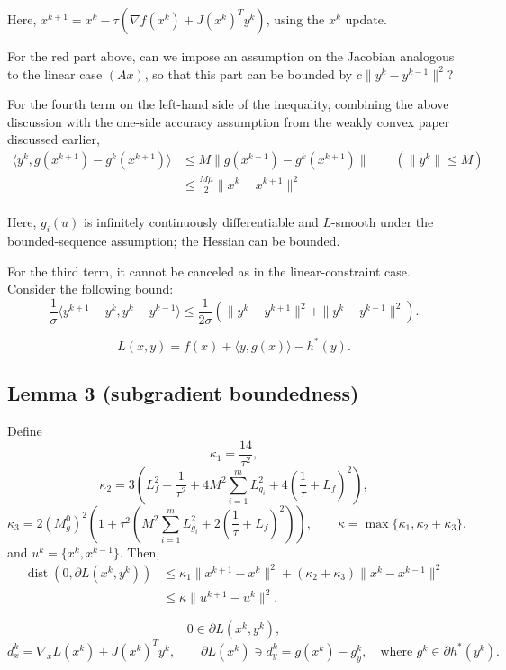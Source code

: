 \documentclass[11pt]{article}
\numberwithin{equation}{section}
\newcommand{\dist}{\operatorname{dist}}
\begin{document}
Here, $x^{k+1}=x^k-\tau(\nabla f(x^k)+J(x^k)^Ty^k)$, using the $x^k$ update.

For the red part above, can we impose an assumption on the Jacobian analogous to the linear case $(Ax)$, so that this part can be bounded by $c\|y^k-y^{k-1}\|^2$?

For the fourth term on the left-hand side of the inequality, combining the above discussion with the one-side accuracy assumption from the weakly convex paper discussed earlier,
\begin{align*}
\langle y^k,g(x^{k+1})-g^k(x^{k+1})\rangle
&\le M\|g(x^{k+1})-g^k(x^{k+1})\|\qquad(\|y^k\|\le M)\\
&\le \frac{M\mu}{2}\|x^k-x^{k+1}\|^2\\
\end{align*}

Here, $g_i(u)$ is infinitely continuously differentiable and $L$-smooth under the bounded-sequence assumption; the Hessian can be bounded.

For the third term, it cannot be canceled as in the linear-constraint case. Consider the following bound:
\[
\frac{1}{\sigma}\langle y^{k+1}-y^k,y^k-y^{k-1}\rangle
\le \frac{1}{2\sigma}\left(\|y^k-y^{k+1}\|^2+\|y^k-y^{k-1}\|^2\right).
\]

\[
L(x,y)=f(x)+\langle y,g(x)\rangle-h^*(y). \tag{2.12}
\]

\subsection*{Lemma 3 (subgradient boundedness)}

Define
\[
\kappa_1=\frac{14}{\tau^2},
\]
\[
\kappa_2=3\left(L_f^2+\frac{1}{\tau^2}+4M^2\sum_{i=1}^mL_{g_i}^2+4\left(\frac{1}{\tau}+L_f\right)^2\right),
\]
\[
\kappa_3=2(M_g^0)^2\left(1+\tau^2\left(M^2\sum_{i=1}^mL_{g_i}^2+2\left(\frac{1}{\tau}+L_f\right)^2\right)\right),
\qquad
\kappa=\max\{\kappa_1,\kappa_2+\kappa_3\},
\]
and $u^k=\{x^k,x^{k-1}\}$. Then,
\begin{align*}
\dist(0,\partial L(x^k,y^k))
&\le \kappa_1\|x^{k+1}-x^k\|^2
+(\kappa_2+\kappa_3)\|x^k-x^{k-1}\|^2 \tag{2.13}\\
&\le \kappa\|u^{k+1}-u^k\|^2. \tag{2.14}
\end{align*}

\[
0\in\partial L(x^k,y^k),
\]
\[
d_x^k=\nabla_xL(x^k)+J(x^k)^Ty^k,
\qquad
\partial L(x^k)\ni d_y^k=g(x^k)-g_y^k,
\quad\text{where }g^k\in\partial h^*(y^k).
\]
\end{document}
